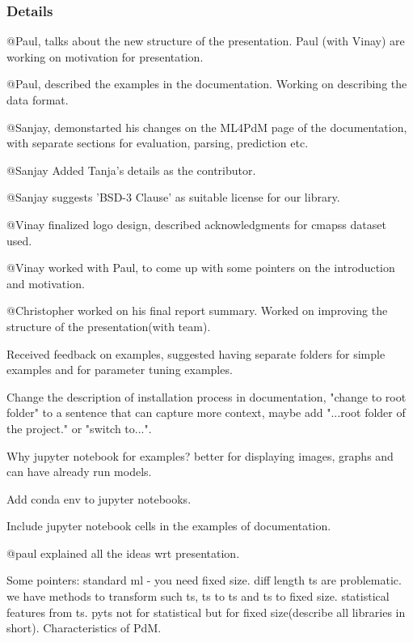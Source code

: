 \documentclass[11pt]{meetingmins} %
\begin{document}
\subsubsection{Details}
\begin{hiddensubitems}
    \item @Paul, talks about the new structure of the presentation. Paul (with Vinay) are working on motivation for presentation.
    \item @Paul, described the examples in the documentation. Working on describing the data format.
    \item @Sanjay, demonstarted his changes on the ML4PdM page of the documentation, with separate sections for evaluation, parsing, prediction etc.
    \item @Sanjay Added Tanja's details as the contributor.
    \item @Sanjay suggests 'BSD-3 Clause' as suitable license for our library.
    \item @Vinay finalized logo design, described acknowledgments for cmapss dataset used.
    \item @Vinay worked with Paul, to come up with some pointers on the introduction and motivation.
    \item @Christopher worked on his final report summary. Worked on improving the structure of the presentation(with team).
    \item Received feedback on examples, suggested having separate folders for simple examples and for parameter tuning examples.
    \item Change the description of installation process in documentation, "change to root folder" to a sentence that can capture more context, maybe add "...root folder of the project." or "switch to...".
    \item Why jupyter notebook for examples? better for displaying images, graphs and can have already run models.
    \item Add conda env to jupyter notebooks.
    \item Include jupyter notebook cells in the examples of documentation.
    \item @paul explained all the ideas wrt presentation.
    \item Some pointers: standard ml - you need fixed size. diff length ts are problematic. we have methods to transform such ts, ts to ts and ts to fixed size. statistical features from ts. pyts not for statistical but for fixed size(describe all libraries in short). Characteristics of PdM.

\end{hiddensubitems}
\end{document}
